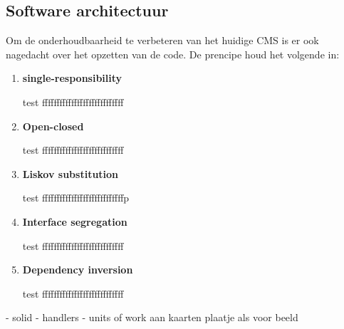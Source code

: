 \subsection{Software architectuur}
Om de onderhoudbaarheid te verbeteren van het huidige CMS is er ook nagedacht over het opzetten van de code.
De prencipe houd het volgende in: 
\begin{enumerate}
    \item \textbf{single-responsibility}
    
    \whitespace
    test ffffffffffffffffffffffffffff

    \item \textbf{Open-closed} 
        
    \whitespace
    test ffffffffffffffffffffffffffff
    
    \item \textbf{Liskov substitution} 
        
    \whitespace
    test ffffffffffffffffffffffffffffp
    \item \textbf{Interface segregation} 

    \whitespace
    test ffffffffffffffffffffffffffff
    \item \textbf{Dependency inversion} 
    
    \whitespace
    test ffffffffffffffffffffffffffff
\end{enumerate}



- solid
- handlers
- units of work aan kaarten
plaatje als voor beeld

